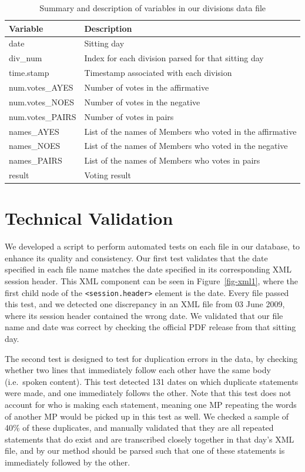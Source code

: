 \documentclass[
  letterpaper,
  DIV=11,
  numbers=noendperiod]{scrartcl}
\begin{document}
\hypertarget{tbl-divisions}{}
\begin{table}[H]
\caption{\label{tbl-divisions}Summary and description of variables in our divisions data file }\tabularnewline

\centering
\begin{tabular}{ll}
\toprule
Variable & Description\\
\midrule
date & Sitting day\\
div\_num & Index for each division parsed for that sitting day\\
time.stamp & Timestamp associated with each division\\
num.votes\_AYES & Number of votes in the affirmative\\
num.votes\_NOES & Number of votes in the negative\\
\addlinespace
num.votes\_PAIRS & Number of votes in pairs\\
names\_AYES & List of the names of Members who voted in the affirmative\\
names\_NOES & List of the names of Members who voted in the negative\\
names\_PAIRS & List of the names of Members who votes in pairs\\
result & Voting result\\
\bottomrule
\end{tabular}
\end{table}

\hypertarget{technical-validation}{%
\section{Technical Validation}\label{technical-validation}}

We developed a script to perform automated tests on each file in our
database, to enhance its quality and consistency. Our first test
validates that the date specified in each file name matches the date
specified in its corresponding XML session header. This XML component
can be seen in Figure~\ref{fig-xml1}, where the first child node of the
\texttt{\textless{}session.header\textgreater{}} element is the date.
Every file passed this test, and we detected one discrepancy in an XML
file from 03 June 2009, where its session header contained the wrong
date. We validated that our file name and date was correct by checking
the official PDF release from that sitting day.

The second test is designed to test for duplication errors in the data,
by checking whether two lines that immediately follow each other have
the same body (i.e.~spoken content). This test detected 131 dates on
which duplicate statements were made, and one immediately follows the
other. Note that this test does not account for who is making each
statement, meaning one MP repeating the words of another MP would be
picked up in this test as well. We checked a sample of 40\% of these
duplicates, and manually validated that they are all repeated statements
that do exist and are transcribed closely together in that day's XML
file, and by our method should be parsed such that one of these
statements is immediately followed by the other.
\end{document}
